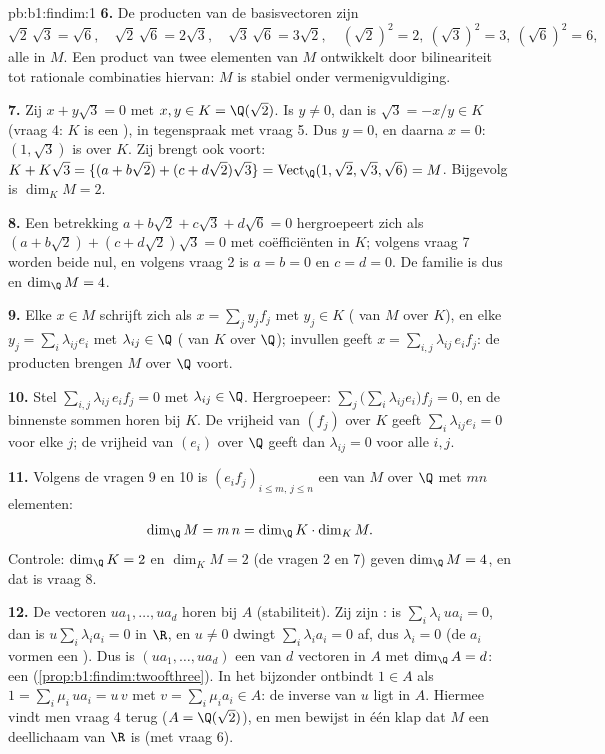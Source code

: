 \begin{solution}{pb:b1:findim:1}
\textbf{6.} De producten van de basisvectoren zijn
\[
\sqrt2\,\sqrt3 = \sqrt6,\quad
\sqrt2\,\sqrt6 = 2\sqrt3,\quad
\sqrt3\,\sqrt6 = 3\sqrt2,\quad
(\sqrt2)^2 = 2,\ (\sqrt3)^2 = 3,\ (\sqrt6)^2 = 6,
\]
alle in $M$. Een product van twee elementen van $M$ ontwikkelt door
bilineariteit tot rationale combinaties hiervan: $M$ is stabiel
onder vermenigvuldiging.

\textbf{7.} Zij $x + y\sqrt3 = 0$ met $x, y \in K = \Q(\sqrt2)$. Is
$y \neq 0$, dan is $\sqrt3 = -x/y \in K$ (vraag 4: $K$ is een
), in tegenspraak met vraag 5. Dus $y = 0$, en daarna $x =
0$: $(1, \sqrt3)$ is  over $K$. Zij brengt ook voort: $K +
K\sqrt3 = \{(a + b\sqrt2) + (c + d\sqrt2)\sqrt3\} =
\operatorname{Vect}_\Q (1, \sqrt2, \sqrt3, \sqrt6) = M$. Bijgevolg
is $\dim_K M = 2$.

\textbf{8.} Een betrekking $a + b\sqrt2 + c\sqrt3 + d\sqrt6 = 0$
hergroepeert zich als $(a + b\sqrt2) + (c + d\sqrt2)\sqrt3 = 0$ met
coëfficiënten in $K$; volgens vraag 7 worden beide nul, en volgens
vraag 2 is $a = b = 0$ en $c = d = 0$. De familie is dus  en
$\dim_\Q M = 4$.

\textbf{9.} Elke $x \in M$ schrijft zich als $x = \sum_j y_j f_j$
met $y_j \in K$ ( van $M$ over $K$), en elke $y_j = \sum_i
\lambda_{ij} e_i$ met $\lambda_{ij} \in \Q$ ( van $K$ over
$\Q$); invullen geeft $x = \sum_{i,j} \lambda_{ij}\, e_i f_j$: de
producten brengen $M$ over $\Q$ voort.

\textbf{10.} Stel $\sum_{i,j} \lambda_{ij}\, e_i f_j = 0$ met
$\lambda_{ij} \in \Q$. Hergroepeer: $\sum_j \bigl(\sum_i
\lambda_{ij} e_i\bigr) f_j = 0$, en de binnenste sommen horen bij
$K$. De vrijheid van $(f_j)$ over $K$ geeft $\sum_i \lambda_{ij}
e_i = 0$ voor elke $j$; de vrijheid van $(e_i)$ over $\Q$ geeft dan
$\lambda_{ij} = 0$ voor alle $i, j$.

\textbf{11.} Volgens de vragen 9 en 10 is $(e_i f_j)_{i \leq m,\, j
\leq n}$ een  van $M$ over $\Q$ met $mn$ elementen:
\[
\dim_\Q M = m\,n = \dim_\Q K \cdot \dim_K M .
\]
Controle: $\dim_\Q K = 2$ en $\dim_K M = 2$ (de vragen 2 en 7)
geven $\dim_\Q M = 4$, en dat is vraag 8.

\textbf{12.} De vectoren $u a_1, \dots, u a_d$ horen bij $A$
(stabiliteit). Zij zijn : is $\sum_i \lambda_i\, u a_i = 0$,
dan is $u \sum_i \lambda_i a_i = 0$ in $\R$, en $u \neq 0$ dwingt
$\sum_i \lambda_i a_i = 0$ af, dus $\lambda_i = 0$ (de $a_i$ vormen
een ). Dus is $(u a_1, \dots, u a_d)$ een  van
$d$ vectoren in $A$ met $\dim_\Q A = d$: een 
(\cref{prop:b1:findim:twoofthree}). In het bijzonder ontbindt $1
\in A$ als $1 = \sum_i \mu_i\, u a_i = u\,v$ met $v = \sum_i \mu_i
a_i \in A$: de inverse van $u$ ligt in $A$. Hiermee vindt men vraag
4 terug ($A = \Q(\sqrt2)$), en men bewijst in één klap dat $M$ een
deellichaam van $\R$ is (met vraag 6).


\end{solution}
